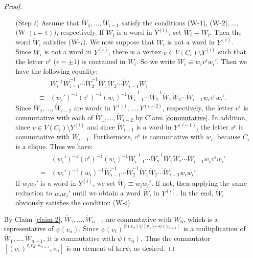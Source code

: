 \documentclass{amsart}
\theoremstyle{definition}
\theoremstyle{plain}
\numberwithin{equation}{section}
\begin{document}
\begin{proof}
\begin{enumerate}
 \item[(Step $i$)] Assume that $\check{W}_1, \ldots, \check{W}_{i-1}$ satisfy the conditions (W-$1$), (W-$2$)$,\ldots,$(W-$(i-1)$), respectively. 
 If $W_i$ is a word in $Y^{(i)}$, set $\check{W}_i \equiv W_i$. 
 Then the word $\check{W}_i$ satisfies (W-$i$). 
 We now suppose that $W_i$ is not a word in $Y^{(i)}$.    
 Since $W_i$ is not a word in $Y^{(i)}$, there is a vertex $v \in V(C_i) \setminus Y^{(i)}$ such that the letter $v^{\epsilon}$ ($\epsilon = \pm 1$) is contained in $W_i$. 
 So we write $W_i \equiv w_i v^{\epsilon} w_i'$. 
 Then we have the following equality: 
 \begin{align*}
 &W_i^{-1} \check{W}_{i-1}^{-1} \cdots \check{W}_{2}^{-1} \check{W}_1 \check{W}_2 \cdots \check{W}_{i-1} W_i \\ 
 \equiv &(w_i')^{-1} (v^{\epsilon})^{-1} (w_i)^{-1} \check{W}_{i-1}^{-1} \cdots \check{W}_{2}^{-1} \check{W}_1 \check{W}_2 \cdots \check{W}_{i-1} w_i v^{\epsilon} w_i'.
 \end{align*}
 Since $\check{W}_1, \ldots, \check{W}_{i-2}$ are words in $Y^{(1)}, \ldots, Y^{(i-2)}$, respectively, the letter $v^{\epsilon}$ is commutative with each of $\check{W}_1, \ldots, \check{W}_{i-2}$ by Claim \ref{commutative}. 
 In addition, since $v \in V(C_i) \setminus Y^{(i)}$ and since $\check{W}_{i-1}$ is a word in $Y^{(i-1)}$, the letter $v^{\epsilon}$ is commutative with $\check{W}_{i-1}$.  
 Furthermore, $v^{\epsilon}$ is commutative with $w_i$, because $C_i$ is a clique. 
 Thus we have: 
  \begin{align*}
 &(w_i')^{-1} (v^{\epsilon})^{-1} (w_i)^{-1} \check{W}_{i-1}^{-1} \cdots \check{W}_{2}^{-1} \check{W}_1 \check{W}_2 \cdots \check{W}_{i-1} w_i v^{\epsilon} w_i' \\
 =& (w_i')^{-1} (w_i)^{-1} \check{W}_{i-1}^{-1} \cdots \check{W}_{2}^{-1} \check{W}_1 \check{W}_2 \cdots \check{W}_{i-1} w_i w_i'. 
 \end{align*}
 If $w_i w_i'$ is a word in $Y^{(i)}$, we set $\check{W}_i \equiv w_i w_i'$. 
If not, then applying the same reduction to $w_i w_i'$
until we obtain a word $\check{W}_i$ in $Y^{(i)}$. 
In the end, $\check{W}_i$ obviously satisfies the condition (W-$i$). 
\end{enumerate}

By Claim \ref{claim-2}, $\check{W}_1, \ldots, \check{W}_{n-1}$ are commutative with $W_n$, which is a representative of $\psi(v_n)$. 
Since ${\psi(v_1)}^{\psi(v_2) \psi(v_3) \cdots \psi(v_{n-1})}$ is a multiplication of $\check{W}_1, \ldots, \check{W}_{n-1}$, it is commutative with $\psi(v_n)$. 
Thus the commutator $[(v_1)^{v_2 v_3\cdots v_{n-1}}, v_n]$ is an element of $\mathrm{ker}\psi$, as desired. 
\end{proof}
\end{document}
